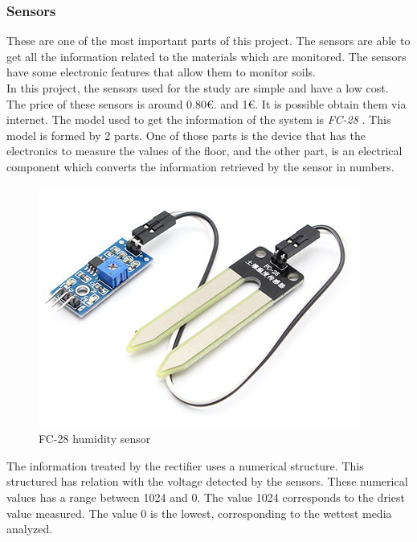 \subsubsection{Sensors}

These are one of the most important parts of this project. The sensors are able to get all the information related to the materials which are monitored. The sensors have some electronic features that allow them to monitor soils.\\

In this project, the sensors used for the study are simple and have a low cost. The price of these sensors is around 0.80\euro . and 1\euro . It is possible obtain them via internet. The model used to get the information of the system is \textit{FC-28} \cite{FC_28}. This model is formed by 2 parts. One of those parts is the device that has the electronics to measure the values of the floor, and the other part, is an electrical component which converts the information retrieved by the sensor in numbers.\\

\begin{figure}[H]
\begin{centering}
\includegraphics[scale=0.8]{IMGS/FC-28.png}
\caption{FC-28 humidity sensor \label{FC28}}
\end{centering}
\end{figure}

The information treated by the rectifier uses a numerical structure. This structured has relation with the voltage detected by the sensors. These numerical values has a range between 1024 and 0. The value 1024 corresponds to the driest value measured. The value 0 is the lowest, corresponding to the wettest media analyzed.\\

